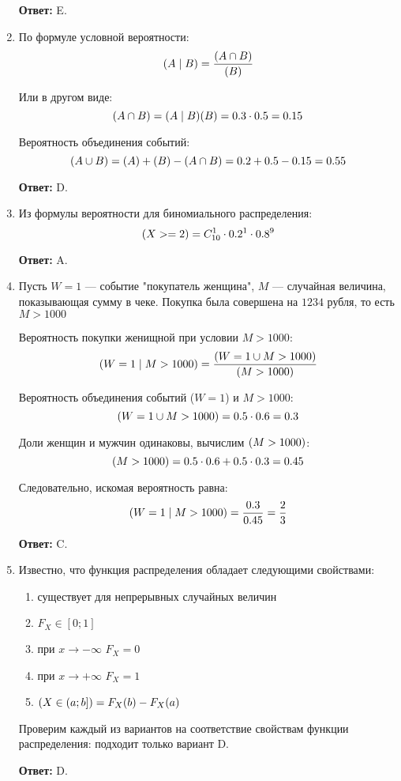 \documentclass[a4paper]{article} %
\let\P\relax
\DeclareMathOperator{\P}{\mathbb{P}}
\begin{document}
\begin{enumerate}
    \textbf{Ответ:} E.
    
    
    \item
    По формуле условной вероятности:
    \[\P(A\mid B) = \frac{\P(A\cap B)}{\P(B)}\]
    
    Или в другом виде:
    \[\P(A\cap B)=\P(A\mid B)\P(B) = 0.3 \cdot 0.5 = 0.15\]
    
    Вероятность объединения событий:
    \[\P(A\cup B) = \P(A) + \P(B) - \P(A\cap B) = 0.2+0.5-0.15 = 0.55\]
    
    \textbf{Ответ:} D.
    
    
    \item
    Из формулы вероятности для биномиального распределения:
    \[\P(X>=2) = C_{10}^1 \cdot0.2^1 \cdot 0.8^9\]
    
    \textbf{Ответ:} A.
    
    
    \item
    Пусть $W=1$ — событие "покупатель женщина", $M$ — случайная величина, показывающая сумму в чеке. 
    Покупка была совершена на $1234$ рубля, то есть $M>1000$
    
    Вероятность покупки женищной при условии $M>1000$:
    \[\P(W=1 \mid M>1000) = \frac{\P(W=1 \cup M>1000)}{\P(M>1000)}\]
    
    Вероятность объединения событий ($W=1$) и $M>1000$:
    \[\P(W=1 \cup M>1000) = 0.5 \cdot 0.6 = 0.3\]

    Доли женщин и мужчин одинаковы, вычислим $\P(M>1000)$:
    \[\P(M>1000) = 0.5 \cdot 0.6 + 0.5 \cdot 0.3 = 0.45\]
    
    Следовательно, искомая вероятность равна:
    \[\P(W=1 \mid M>1000) = \frac{0.3}{0.45} = \frac{2}{3}\]
    
    \textbf{Ответ:} C.
    
    
    \item
    Известно, что функция распределения обладает следующими свойствами:
    \begin{enumerate}
        \item существует для непрерывных случайных величин
        \item $F_X \in [0; 1]$
        \item при $x\rightarrow{-\infty}$ $F_X = 0$
        \item при $x\rightarrow{+\infty}$ $F_X = 1$
        \item $\P(X \in (a; b]) = F_X(b) - F_X(a)$
    \end{enumerate} 
    
    Проверим каждый из вариантов на соответствие свойствам функции распределения: подходит только вариант D.
    
    \textbf{Ответ:} D.
    
    
\end{enumerate}
\end{document}
